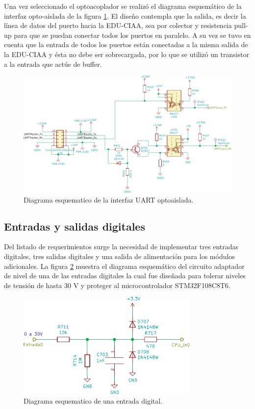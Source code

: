 Una vez seleccionado el optoacoplador se realizó el diagrama esquemático de la interfaz opto-aislada de la figura \ref{fig:InterfazOpto}. El diseño contempla que la salida, es decir la línea de datos del puerto hacia la EDU-CIAA, sea por colector y resistencia pull-up para que se puedan conectar todos los puertos en paralelo. A su vez se tuvo en cuenta que la entrada de todos los puertos están conectadas a la misma salida de la EDU-CIAA y ésta no debe ser sobrecargada, por lo que se utilizó un transistor a la entrada que actúe de buffer.

\begin{figure}[H]
	\centering
	\includegraphics[width=1\textwidth]{./Figures/InterfazOpto.pdf}
	\caption{Diagrama esquematico de la interfaz UART optoaislada.}
	\label{fig:InterfazOpto}
\end{figure}


\subsection{Entradas y salidas digitales}

Del listado de requerimientos surge la necesidad de implementar tres entradas digitales, tres salidas digitales y una salida de alimentación para los módulos adicionales. La figura \ref{fig:EntradaDigital} muestra el diagrama esquemático del circuito adaptador de nivel de una de las entradas digitales la cual fue diseñada para tolerar niveles de tensión de hasta 30 V y proteger al microcontrolador STM32F108C8T6.

\begin{figure}[H]
	\centering
	\includegraphics[width=0.8\textwidth]{./Figures/EntradaDigital.pdf}
	\caption{Diagrama esquematico de una entrada digital.}
	\label{fig:EntradaDigital}
\end{figure}

